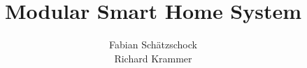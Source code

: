 \documentclass[12pt]{scrreport}
\title{Modular Smart Home System}
\author{Fabian Schätzschock \\ Richard Krammer}
\begin{document}
    \maketitle \newpage
    \tableofcontents \newpage
    
    
    
    
    
    
    
    
    
    
    \cite{Wikipedia}
    
    
    
    \listoffigures
    
    
\end{document}
